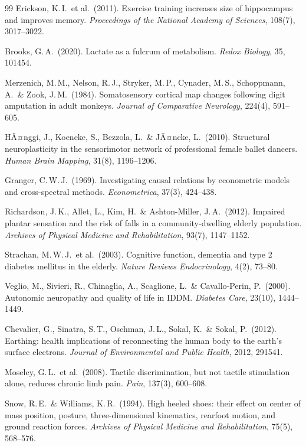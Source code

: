 ﻿\documentclass[12pt,a4paper]{report}
\theoremstyle{plain}
\theoremstyle{definition}
\theoremstyle{remark}
\begin{document}
\begin{thebibliography}{99}
Erickson, K.\,I.\ et al.\ (2011).
Exercise training increases size of hippocampus and improves memory.
\textit{Proceedings of the National Academy of Sciences}, 108(7), 3017--3022.

Brooks, G.\,A.\ (2020).
Lactate as a fulcrum of metabolism.
\textit{Redox Biology}, 35, 101454.

Merzenich, M.\,M., Nelson, R.\,J., Stryker, M.\,P., Cynader, M.\,S.,
Schoppmann, A.\ \& Zook, J.\,M.\ (1984).
Somatosensory cortical map changes following digit amputation in adult monkeys.
\textit{Journal of Comparative Neurology}, 224(4), 591--605.

HÃ¤nggi, J., Koeneke, S., Bezzola, L.\ \& JÃ¤ncke, L.\ (2010).
Structural neuroplasticity in the sensorimotor network of professional female ballet dancers.
\textit{Human Brain Mapping}, 31(8), 1196--1206.

Granger, C.\,W.\,J.\ (1969).
Investigating causal relations by econometric models and cross-spectral methods.
\textit{Econometrica}, 37(3), 424--438.

Richardson, J.\,K., Allet, L., Kim, H.\ \& Ashton-Miller, J.\,A.\ (2012).
Impaired plantar sensation and the risk of falls in a community-dwelling elderly population.
\textit{Archives of Physical Medicine and Rehabilitation}, 93(7), 1147--1152.

Strachan, M.\,W.\,J.\ et al.\ (2003).
Cognitive function, dementia and type 2 diabetes mellitus in the elderly.
\textit{Nature Reviews Endocrinology}, 4(2), 73--80.

Veglio, M., Sivieri, R., Chinaglia, A., Scaglione, L.\ \& Cavallo-Perin, P.\ (2000).
Autonomic neuropathy and quality of life in IDDM.
\textit{Diabetes Care}, 23(10), 1444--1449.

Chevalier, G., Sinatra, S.\,T., Oschman, J.\,L., Sokal, K.\ \& Sokal, P.\ (2012).
Earthing: health implications of reconnecting the human body to the earth's surface electrons.
\textit{Journal of Environmental and Public Health}, 2012, 291541.

Moseley, G.\,L.\ et al.\ (2008).
Tactile discrimination, but not tactile stimulation alone, reduces chronic limb pain.
\textit{Pain}, 137(3), 600--608.

Snow, R.\,E.\ \& Williams, K.\,R.\ (1994).
High heeled shoes: their effect on center of mass position, posture, three-dimensional kinematics, rearfoot motion, and ground reaction forces.
\textit{Archives of Physical Medicine and Rehabilitation}, 75(5), 568--576.


\end{thebibliography}
\end{document}

